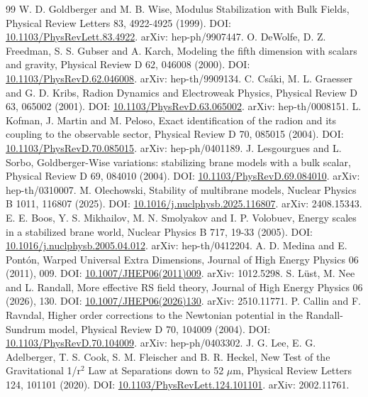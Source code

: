 \documentclass[11pt,a4paper]{article}
\begin{document}
\begin{thebibliography}{99}
 W. D. Goldberger and M. B. Wise, Modulus Stabilization with Bulk Fields, Physical Review Letters 83, 4922-4925 (1999). DOI: \href{https://doi.org/10.1103/PhysRevLett.83.4922}{10.1103/PhysRevLett.83.4922}. arXiv: hep-ph/9907447.
 O. DeWolfe, D. Z. Freedman, S. S. Gubser and A. Karch, Modeling the fifth dimension with scalars and gravity, Physical Review D 62, 046008 (2000). DOI: \href{https://doi.org/10.1103/PhysRevD.62.046008}{10.1103/PhysRevD.62.046008}. arXiv: hep-th/9909134.
 C. Csáki, M. L. Graesser and G. D. Kribs, Radion Dynamics and Electroweak Physics, Physical Review D 63, 065002 (2001). DOI: \href{https://doi.org/10.1103/PhysRevD.63.065002}{10.1103/PhysRevD.63.065002}. arXiv: hep-th/0008151.
 L. Kofman, J. Martin and M. Peloso, Exact identification of the radion and its coupling to the observable sector, Physical Review D 70, 085015 (2004). DOI: \href{https://doi.org/10.1103/PhysRevD.70.085015}{10.1103/PhysRevD.70.085015}. arXiv: hep-ph/0401189.
 J. Lesgourgues and L. Sorbo, Goldberger-Wise variations: stabilizing brane models with a bulk scalar, Physical Review D 69, 084010 (2004). DOI: \href{https://doi.org/10.1103/PhysRevD.69.084010}{10.1103/PhysRevD.69.084010}. arXiv: hep-th/0310007.
 M. Olechowski, Stability of multibrane models, Nuclear Physics B 1011, 116807 (2025). DOI: \href{https://doi.org/10.1016/j.nuclphysb.2025.116807}{10.1016/j.nuclphysb.2025.116807}. arXiv: 2408.15343.
 E. E. Boos, Y. S. Mikhailov, M. N. Smolyakov and I. P. Volobuev, Energy scales in a stabilized brane world, Nuclear Physics B 717, 19-33 (2005). DOI: \href{https://doi.org/10.1016/j.nuclphysb.2005.04.012}{10.1016/j.nuclphysb.2005.04.012}. arXiv: hep-th/0412204.
 A. D. Medina and E. Pontón, Warped Universal Extra Dimensions, Journal of High Energy Physics 06 (2011), 009. DOI: \href{https://doi.org/10.1007/JHEP06(2011)009}{10.1007/JHEP06(2011)009}. arXiv: 1012.5298.
 S. Lüst, M. Nee and L. Randall, More effective RS field theory, Journal of High Energy Physics 06 (2026), 130. DOI: \href{https://doi.org/10.1007/JHEP06(2026)130}{10.1007/JHEP06(2026)130}. arXiv: 2510.11771.
 P. Callin and F. Ravndal, Higher order corrections to the Newtonian potential in the Randall-Sundrum model, Physical Review D 70, 104009 (2004). DOI: \href{https://doi.org/10.1103/PhysRevD.70.104009}{10.1103/PhysRevD.70.104009}. arXiv: hep-ph/0403302.
 J. G. Lee, E. G. Adelberger, T. S. Cook, S. M. Fleischer and B. R. Heckel, New Test of the Gravitational 1/r\ensuremath{{}^{2}} Law at Separations down to 52 \ensuremath{\mu}m, Physical Review Letters 124, 101101 (2020). DOI: \href{https://doi.org/10.1103/PhysRevLett.124.101101}{10.1103/PhysRevLett.124.101101}. arXiv: 2002.11761.

\end{thebibliography}
\end{document}
